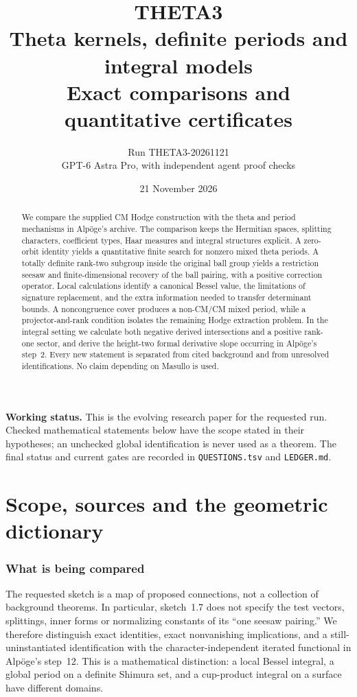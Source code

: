 \documentclass[11pt]{article}
\title{THETA3\\Theta kernels, definite periods and integral models\\\large Exact comparisons and quantitative certificates}
\author{Run THETA3-20261121\\GPT-6 Astra Pro, with independent agent proof checks}
\date{21 November 2026}
\theoremstyle{definition}\newtheorem{definition}[theorem]{Definition}\newtheorem{remark}[theorem]{Remark}
\begin{document}
\maketitle
\begin{abstract}
We compare the supplied CM Hodge construction with the theta and period mechanisms in Alp\"oge's archive. The comparison keeps the Hermitian spaces, splitting characters, coefficient types, Haar measures and integral structures explicit. A zero-orbit identity yields a quantitative finite search for nonzero mixed theta periods. A totally definite rank-two subgroup inside the original ball group yields a restriction seesaw and finite-dimensional recovery of the ball pairing, with a positive correction operator. Local calculations identify a canonical Bessel value, the limitations of signature replacement, and the extra information needed to transfer determinant bounds. A noncongruence cover produces a non-CM/CM mixed period, while a projector-and-rank condition isolates the remaining Hodge extraction problem. In the integral setting we calculate both negative derived intersections and a positive rank-one sector, and derive the height-two formal derivative slope occurring in Alp\"oge's step~2. Every new statement is separated from cited background and from unresolved identifications. No claim depending on Masullo is used.
\end{abstract}
\noindent\textbf{Working status.} This is the evolving research paper for the requested run. Checked mathematical statements below have the scope stated in their hypotheses; an unchecked global identification is never used as a theorem. The final status and current gates are recorded in \texttt{QUESTIONS.tsv} and \texttt{LEDGER.md}.

\tableofcontents\clearpage
\part{Scope, sources and the geometric dictionary}
\section{What is being compared}
The requested sketch is a map of proposed connections, not a collection of background theorems. In particular, sketch~1.7 does not specify the test vectors, splittings, inner forms or normalizing constants of its ``one seesaw pairing.'' We therefore distinguish exact identities, exact nonvanishing implications, and a still-uninstantiated identification with the character-independent iterated functional in Alp\"oge's step~12. This is a mathematical distinction: a local Bessel integral, a global period on a definite Shimura set, and a cup-product integral on a surface have different domains.
\end{document}
